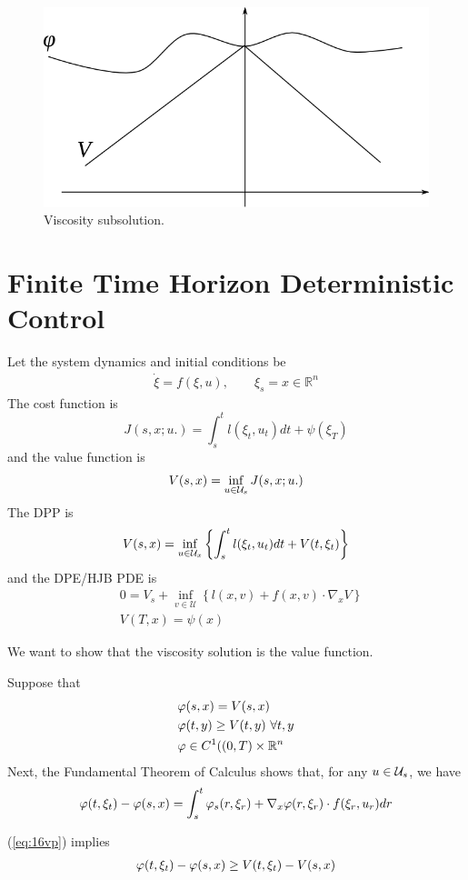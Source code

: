 \begin{figure}[ht!]
\centering
\includegraphics[width=.4\textwidth]{images/16subsol}
\caption{Viscosity subsolution.}
\label{fig:16subsol}
\end{figure}

\section{Finite Time Horizon Deterministic Control}
Let the system dynamics and initial conditions be
\begin{align*}
\dot{\xi} = f(\xi,u), \qquad \xi_s=x\in\mathbb{R}^n
\end{align*}
The cost function is
$$J(s,x;u.) = \int_s^t l(\xi_t,u_t)dt+\psi(\xi_T)$$
and the value function is
$$V(s,x) = \inf_{u\in\mathcal{U}_s}J(s,x;u.)$$
The DPP is
$$V(s,x) = \inf_{u\in\mathcal{U}_x}\left\lbrace \int_s^t l(\xi_t,u_t)dt+V(t,\xi_t) \right\rbrace$$
and the DPE/HJB PDE is
\begin{align}
\label{eq:16dpe}
&0 = V_s + \inf_{v\in\mathcal{U}}\left\lbrace l(x,v)+f(x,v)\cdot\nabla_x V\right\rbrace \\
&V(T,x) = \psi(x) \nonumber
\end{align}

We want to show that the viscosity solution is the value function.

Suppose that
\begin{align}
\label{eq:16vp}
\begin{split}
&\varphi(s,x)=V(s,x) \\
&\varphi(t,y)\geq V(t,y)~\forall t,y \\
&\varphi\in C^1((0,T)\times\mathbb{R}^n
\end{split}
\end{align}
Next, the Fundamental Theorem of Calculus shows that, for any $u\in\mathcal{U}_s$, we have
\begin{align}
\label{eq:16fund}
\varphi(t,\xi_t)-\varphi(s,x) = \int_s^t\varphi_s(r,\xi_r)+\nabla_x\varphi(r,\xi_r)\cdot f(\xi_r,u_r)dr
\end{align}

(\ref{eq:16vp}) implies
\begin{align}
\label{eq:16vpv}
\varphi(t,\xi_t)-\varphi(s,x)\geq V(t,\xi_t)-V(s,x)
\end{align}

